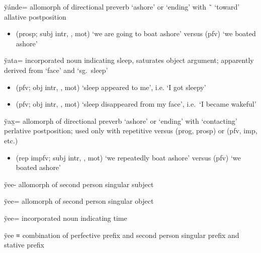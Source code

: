 \documentclass[12pt,letterpaper,oneside,article]{memoir}
\begin{document}
\begin{morphdesc}[resume*=alphalist]
\item[ÿánde=]
	allomorph of  directional preverb ‘ashore’ or ‘ending’
	with  \~\  ‘toward’ allative postposition
	\begin{itemize}
	\item	{} (prosp; subj intr, , mot) ‘we are going to boat ashore’\newline
		versus  (pfv) ‘we boated ashore’
	\end{itemize}

\item[ÿata=]
	incorporated noun indicating sleep,
	saturates object argument;
	apparently derived from  ‘face’ and  ‘sg.\ sleep’
	\begin{itemize}
	\item	{} (pfv; obj intr, , mot) ‘sleep appeared to me’, i.e. ‘I got sleepy’
	\item	{} (pfv; obj intr, , mot) ‘sleep disappeared from my face’,
		i.e.\ ‘I became wakeful’
	\end{itemize}

\item[ÿax̱=]
	allomorph of  directional preverb ‘ashore’ or ‘ending’
	with  ‘contacting’ perlative postposition;
	used only with repetitive versus  (prog, prosp) or  (pfv, imp, etc.)
	\begin{itemize}
	\item	{} (rep impfv; subj intr, , mot) ‘we repeatedly boat ashore’\newline
		versus  (pfv) ‘we boated ashore’
	\end{itemize}

\item[ÿee-]
	allomorph of second person singular subject 

\item[ÿee=]
	allomorph of second person singular object 

\item[ÿee=]
	incorporated noun indicating time

\item[ÿee]
	≡ 
	combination of  perfective prefix and
		 second person singular prefix and
		 stative prefix


\end{morphdesc}
\end{document}
